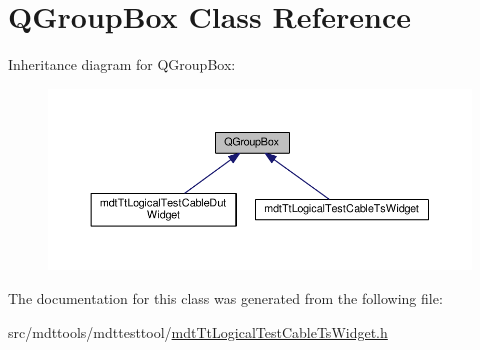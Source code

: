 \hypertarget{class_q_group_box}{\section{Q\-Group\-Box Class Reference}
\label{class_q_group_box}
}


Inheritance diagram for Q\-Group\-Box\-:\nopagebreak
\begin{figure}[H]
\begin{center}
\leavevmode
\includegraphics[width=350pt]{class_q_group_box__inherit__graph}
\end{center}
\end{figure}


The documentation for this class was generated from the following file\-:\begin{DoxyCompactItemize}
\item 
src/mdttools/mdttesttool/\hyperlink{mdt_tt_logical_test_cable_ts_widget_8h}{mdt\-Tt\-Logical\-Test\-Cable\-Ts\-Widget.\-h}\end{DoxyCompactItemize}
